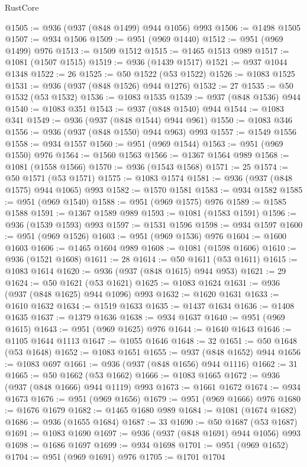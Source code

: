 \begin{lexlean}{RustCore}
\begin{coremodule}
@1505 := @936 (@937 (@848 @1499) @944 @1056) @993
@1506 := @1498 @1505
@1507 := @934 @1506
@1509 := @951 (@969 @1440)
@1512 := @951 (@969 @1499) @976
@1513 := @1509 @1512
@1515 := @1465 @1513 @989
@1517 := @1081 (@1507 @1515)
@1519 := @936 (@1439 @1517)
@1521 := @937 @1044 @1348
@1522 := 26
@1525 := @50 @1522 (@53 @1522)
@1526 := @1083 @1525
@1531 := @936 (@937 (@848 @1526) @944 @1276)
@1532 := 27
@1535 := @50 @1532 (@53 @1532)
@1536 := @1083 @1535
@1539 := @937 (@848 @1536) @944
@1540 := @1083 @351
@1543 := @937 (@848 @1540) @944
@1544 := @1083 @341
@1549 := @936 (@937 (@848 @1544) @944 @961)
@1550 := @1083 @346
@1556 := @936 (@937 (@848 @1550) @944 @963) @993
@1557 := @1549 @1556
@1558 := @934 @1557
@1560 := @951 (@969 @1544)
@1563 := @951 (@969 @1550) @976
@1564 := @1560 @1563
@1566 := @1367 @1564 @989
@1568 := @1081 (@1558 @1566)
@1570 := @936 (@1543 @1568)
@1571 := 25
@1574 := @50 @1571 (@53 @1571)
@1575 := @1083 @1574
@1581 := @936 (@937 (@848 @1575) @944 @1065) @993
@1582 := @1570 @1581
@1583 := @934 @1582
@1585 := @951 (@969 @1540)
@1588 := @951 (@969 @1575) @976
@1589 := @1585 @1588
@1591 := @1367 @1589 @989
@1593 := @1081 (@1583 @1591)
@1596 := @936 (@1539 @1593) @993
@1597 := @1531 @1596
@1598 := @934 @1597
@1600 := @951 (@969 @1526)
@1603 := @951 (@969 @1536) @976
@1604 := @1600 @1603
@1606 := @1465 @1604 @989
@1608 := @1081 (@1598 @1606)
@1610 := @936 (@1521 @1608)
@1611 := 28
@1614 := @50 @1611 (@53 @1611)
@1615 := @1083 @1614
@1620 := @936 (@937 (@848 @1615) @944 @953)
@1621 := 29
@1624 := @50 @1621 (@53 @1621)
@1625 := @1083 @1624
@1631 := @936 (@937 (@848 @1625) @944 @1096) @993
@1632 := @1620 @1631
@1633 := @1610 @1632
@1634 := @1519 @1633
@1635 := @1437 @1634
@1636 := @1408 @1635
@1637 := @1379 @1636
@1638 := @934 @1637
@1640 := @951 (@969 @1615)
@1643 := @951 (@969 @1625) @976
@1644 := @1640 @1643
@1646 := @1105 @1644 @1113
@1647 := @1055 @1646
@1648 := 32
@1651 := @50 @1648 (@53 @1648)
@1652 := @1083 @1651
@1655 := @937 (@848 @1652) @944
@1656 := @1083 @697
@1661 := @936 (@937 (@848 @1656) @944 @1116)
@1662 := 31
@1665 := @50 @1662 (@53 @1662)
@1666 := @1083 @1665
@1672 := @936 (@937 (@848 @1666) @944 @1119) @993
@1673 := @1661 @1672
@1674 := @934 @1673
@1676 := @951 (@969 @1656)
@1679 := @951 (@969 @1666) @976
@1680 := @1676 @1679
@1682 := @1465 @1680 @989
@1684 := @1081 (@1674 @1682)
@1686 := @936 (@1655 @1684)
@1687 := 33
@1690 := @50 @1687 (@53 @1687)
@1691 := @1083 @1690
@1697 := @936 (@937 (@848 @1691) @944 @1056) @993
@1698 := @1686 @1697
@1699 := @934 @1698
@1701 := @951 (@969 @1652)
@1704 := @951 (@969 @1691) @976
@1705 := @1701 @1704

\end{coremodule}
\end{lexlean}
